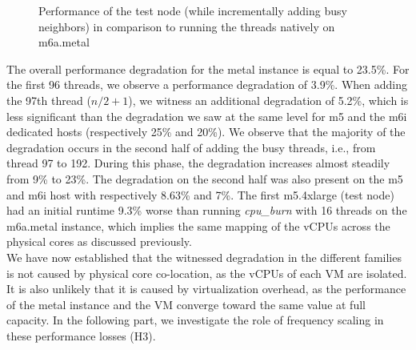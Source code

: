 \begin{figure}[H]
\caption{Performance of the test node (while incrementally adding busy neighbors) in comparison to running the threads natively on m6a.metal}
\label{fig::m6a_metal_vs_VMs}
\end{figure}
\noindent
The overall performance degradation for the metal instance is equal to 23.5\%. 
For the first 96 threads, we observe a performance 
degradation of 3.9\%. When adding the 97th thread ($n/2 + 1$), we witness an additional 
degradation of 5.2\%, which is less significant than the degradation we saw at the same level for 
m5 and the m6i dedicated hosts (respectively 25\% and 20\%). 
We observe that the majority of the degradation occurs in the second half of adding the busy threads, 
i.e., from thread 97 to 192. During this phase, the degradation increases almost steadily 
from 9\% to 23\%. The degradation on the second half was also present on the m5 and m6i host 
with respectively 8.63\% and 7\%. 
The first m5.4xlarge (test node) had an initial runtime 9.3\% worse than running \textit{cpu\_burn} with 
16 threads on the m6a.metal instance, which implies the same mapping of the vCPUs across the physical 
cores as discussed previously. \\ 
We have now established that the witnessed degradation in the different families is not caused by 
physical core co-location, as the vCPUs of each VM are isolated. It is also unlikely that it is caused 
by virtualization overhead, as the performance of the metal instance and the VM converge toward
the same value at full capacity. In the following part, we investigate the role of frequency scaling 
in these performance losses (H3). 